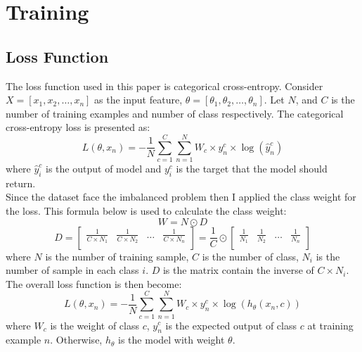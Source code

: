 \section{Training}
\subsection{Loss Function}
The loss function used in this paper is categorical cross-entropy. Consider $X = [x_1, x_2, \dots, x_n]$ as the input feature, $\theta = [\theta_1, \theta_2, \dots, \theta_n]$. Let $N$, and $C$ is the number of training examples and number of class respectively. The categorical cross-entropy loss is presented as:
\[L(\theta, x_n) = -\frac{1}{N}\sum_{c=1}^{C}\sum_{n=1}^{N}W_c\times y^c_n \times \log(\hat{y}^c_n)\]
where $\hat{y}^c_i$  is the output of model and $y^c_i$ is the target that the model should return. \\
Since the dataset face the imbalanced problem then I applied the class weight for the loss. This formula below is used to calculate the class weight:
\[W = N \odot D\]
\[D = \begin{bmatrix}
	\frac{1}{C \times  N_1} & \frac{1}{C \times  N_2} & \dots & \frac{1}{C \times  N_n}\\
\end{bmatrix} = \frac{1}{C} \odot \begin{bmatrix}
\frac{1}{N_1} & \frac{1}{N_2} & \dots & \frac{1}{N_n}\\
\end{bmatrix}\]
where $N$ is the number of training sample, $C$ is the number of class, $N_i$ is the number of sample in each class $i$. $D$ is the matrix contain the inverse of $C \times N_i$. The overall loss function is then become\cite{8943952}:
\[
	L(\theta, x_n) = -\frac{1}{N}\sum_{c=1}^{C}\sum_{n=1}^{N} W_c \times y^c_n \times \log(h_\theta(x_n, c))
\]
where $W_c$ is the weight of class $c$, $y^c_n$ is the expected output of class $c$ at training example $n$. Otherwise, $h_\theta$ is the model with weight $\theta$.
